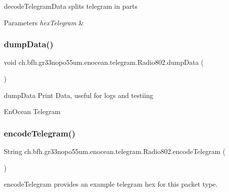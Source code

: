 decode\+Telegram\+Data splits telegram in parts


\begin{DoxyParams}{Parameters}
{\em hex\+Telegram} & \\
\hline
\end{DoxyParams}
\hypertarget{classch_1_1bfh_1_1gr33nopo55um_1_1enocean_1_1telegram_1_1_radio802_aae7fc0aee7c0006a0cacd696e2737024}{}\label{classch_1_1bfh_1_1gr33nopo55um_1_1enocean_1_1telegram_1_1_radio802_aae7fc0aee7c0006a0cacd696e2737024} 
\subsubsection{\texorpdfstring{dump\+Data()}{dumpData()}}
{\footnotesize\ttfamily void ch.\+bfh.\+gr33nopo55um.\+enocean.\+telegram.\+Radio802.\+dump\+Data (\begin{DoxyParamCaption}{ }\end{DoxyParamCaption})}

dump\+Data Print Data, useful for logs and testiing 

En\+Ocean Telegram \hypertarget{classch_1_1bfh_1_1gr33nopo55um_1_1enocean_1_1telegram_1_1_radio802_ae1032a631a54c5c367ae6af91ba052d8}{}\label{classch_1_1bfh_1_1gr33nopo55um_1_1enocean_1_1telegram_1_1_radio802_ae1032a631a54c5c367ae6af91ba052d8} 
\subsubsection{\texorpdfstring{encode\+Telegram()}{encodeTelegram()}}
{\footnotesize\ttfamily String ch.\+bfh.\+gr33nopo55um.\+enocean.\+telegram.\+Radio802.\+encode\+Telegram (\begin{DoxyParamCaption}{ }\end{DoxyParamCaption})}

encode\+Telegram provides an example telegram hex for this packet type.

